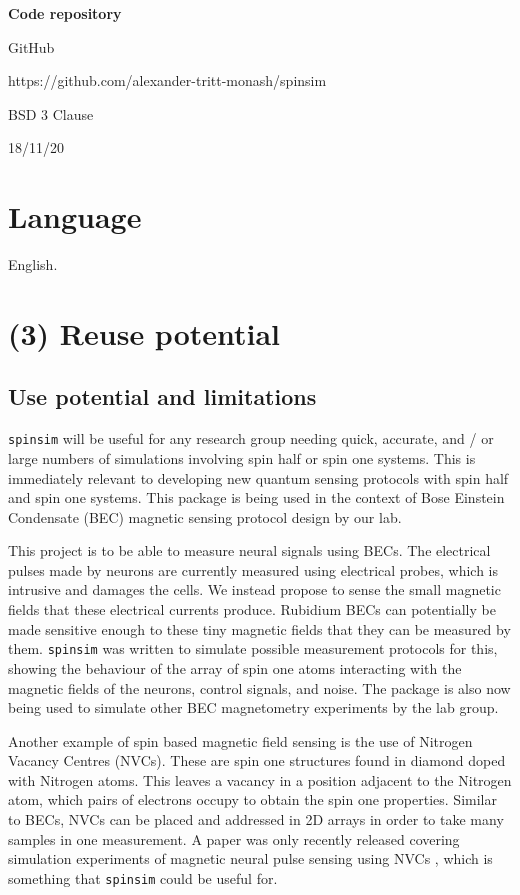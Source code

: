 \documentclass{jors}
\begin{document}
{\bf Code repository}

\begin{description}[noitemsep,topsep=0pt]
	\item[Name:] GitHub
	\item[Persistent identifier:] https://github.com/alexander-tritt-monash/spinsim
	\item[Licence:] BSD 3 Clause
	\item[Date published:] 18/11/20
\end{description}

\section{Language}

English.

\section{(3) Reuse potential}

	\subsection{Use potential and limitations}
		\texttt{spinsim} will be useful for any research group needing quick, accurate, and / or large numbers of simulations involving spin half or spin one systems. This is immediately relevant to developing new quantum sensing protocols with spin half and spin one systems. This package is being used in the context of Bose Einstein Condensate (BEC) magnetic sensing protocol design by our lab.

		This project is to be able to measure neural signals using BECs. The electrical pulses made by neurons are currently measured using electrical probes, which is intrusive and damages the cells. We instead propose to sense the small magnetic fields that these electrical currents produce. Rubidium BECs can potentially be made sensitive enough to these tiny magnetic fields that they can be measured by them. \texttt{spinsim} was written to simulate possible measurement protocols for this, showing the behaviour of the array of spin one atoms interacting with the magnetic fields of the neurons, control signals, and noise. The package is also now being used to simulate other BEC magnetometry experiments by the lab group.

		Another example of spin based magnetic field sensing is the use of Nitrogen Vacancy Centres (NVCs). These are spin one structures found in diamond doped with Nitrogen atoms. This leaves a vacancy in a position adjacent to the Nitrogen atom, which pairs of electrons occupy to obtain the spin one properties. Similar to BECs, NVCs can be placed and addressed in 2D arrays in order to take many samples in one measurement. A paper was only recently released covering simulation experiments of magnetic neural pulse sensing using NVCs \cite{parashar_axon_2020}, which is something that \texttt{spinsim} could be useful for.
\end{document}

